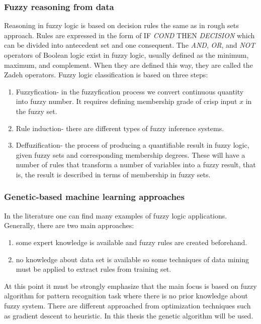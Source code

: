 \subsubsection{Fuzzy reasoning from data}
Reasoning in fuzzy logic is based on decision rules the same as in rough sets approach. 
Rules are expressed in the form of IF \textit{COND} THEN \textit{DECISION} 
which can be divided into antecedent set and one consequent. 
The \textit{AND}, \textit{OR}, and \textit{NOT} operators of 
Boolean logic exist in fuzzy logic, usually defined as the minimum, maximum,
and complement. When they are defined this way, they are called the Zadeh operators.
Fuzzy logic classification is based  on three steps:
\begin{enumerate}
    \item Fuzzyfication- in the fuzzyfication process we 
        convert continuous quantity into fuzzy number. It requires defining
        membership grade of crisp input $x$ in the fuzzy set.
    \item Rule induction- there are different types of fuzzy inference systems. 
    \item Deffuzification- the process of producing a quantifiable result in fuzzy logic,
        given fuzzy sets and corresponding membership degrees. These will have a number of
        rules that transform a number of variables into a fuzzy result, that is, the result 
        is described in terms of membership in fuzzy sets. 
\end{enumerate}
\subsubsection{Genetic-based machine learning approaches}
In the literature one can find many examples of fuzzy logic applications.
Generally, there are two main approaches:
\begin{enumerate}
    \item some expert knowledge is available and fuzzy rules are created
        beforehand.
    \item no knowledge about data set is available so some techniques of data
        mining must be applied to extract rules from training set.
\end{enumerate}
At this point it must be strongly emphasize that the main focus is based on
fuzzy algorithm for pattern recognition task where there is no prior knowledge 
about fuzzy system. There are different approached from optimization techniques
such as gradient descent to heuristic. In this thesis the genetic algorithm
will be used. 

